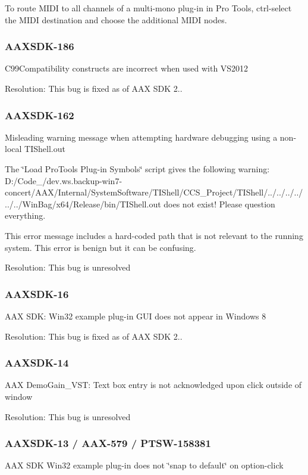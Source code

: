 To route M\+I\+D\+I to all channels of a multi-\/mono plug-\/in in Pro Tools, ctrl-\/select the M\+I\+D\+I destination and choose the additional M\+I\+D\+I nodes.\hypertarget{a00374_AAXSDK-186}{}\subsubsection{A\+A\+X\+S\+D\+K-\/186}\label{a00374_AAXSDK-186}
C99\+Compatibility constructs are incorrect when used with V\+S2012

Resolution\+: This bug is fixed as of A\+A\+X S\+D\+K 2..\hypertarget{a00374_AAXSDK-162}{}\subsubsection{A\+A\+X\+S\+D\+K-\/162}\label{a00374_AAXSDK-162}
Misleading warning message when attempting hardware debugging using a non-\/local T\+I\+Shell.\+out

The \char`\"{}\+Load Pro\+Tools Plug-\/in Symbols\char`\"{} script gives the following warning\+: {\ttfamily D\+:/\+Code\+\_/dev.ws.\+backup-\/win7-\/concert/\+A\+A\+X/\+Internal/\+System\+Software/\+T\+I\+Shell/\+C\+C\+S\+\_\+\+Project/\+T\+I\+Shell/../../../../../../\+Win\+Bag/x64/\+Release/bin/\+T\+I\+Shell.out does not exist! Please question everything.}

This error message includes a hard-\/coded path that is not relevant to the running system. This error is benign but it can be confusing.

Resolution\+: This bug is unresolved\hypertarget{a00374_AAXSDK-16}{}\subsubsection{A\+A\+X\+S\+D\+K-\/16}\label{a00374_AAXSDK-16}
A\+A\+X S\+D\+K\+: Win32 example plug-\/in G\+U\+I does not appear in Windows 8

Resolution\+: This bug is fixed as of A\+A\+X S\+D\+K 2..\hypertarget{a00374_AAXSDK-14}{}\subsubsection{A\+A\+X\+S\+D\+K-\/14}\label{a00374_AAXSDK-14}
A\+A\+X Demo\+Gain\+\_\+\+V\+S\+T\+: Text box entry is not acknowledged upon click outside of window

Resolution\+: This bug is unresolved\hypertarget{a00374_AAXSDK-13}{}\subsubsection{A\+A\+X\+S\+D\+K-\/13 / A\+A\+X-\/579 / P\+T\+S\+W-\/158381}\label{a00374_AAXSDK-13}
A\+A\+X S\+D\+K Win32 example plug-\/in does not \char`\"{}snap to default\char`\"{} on option-\/click

